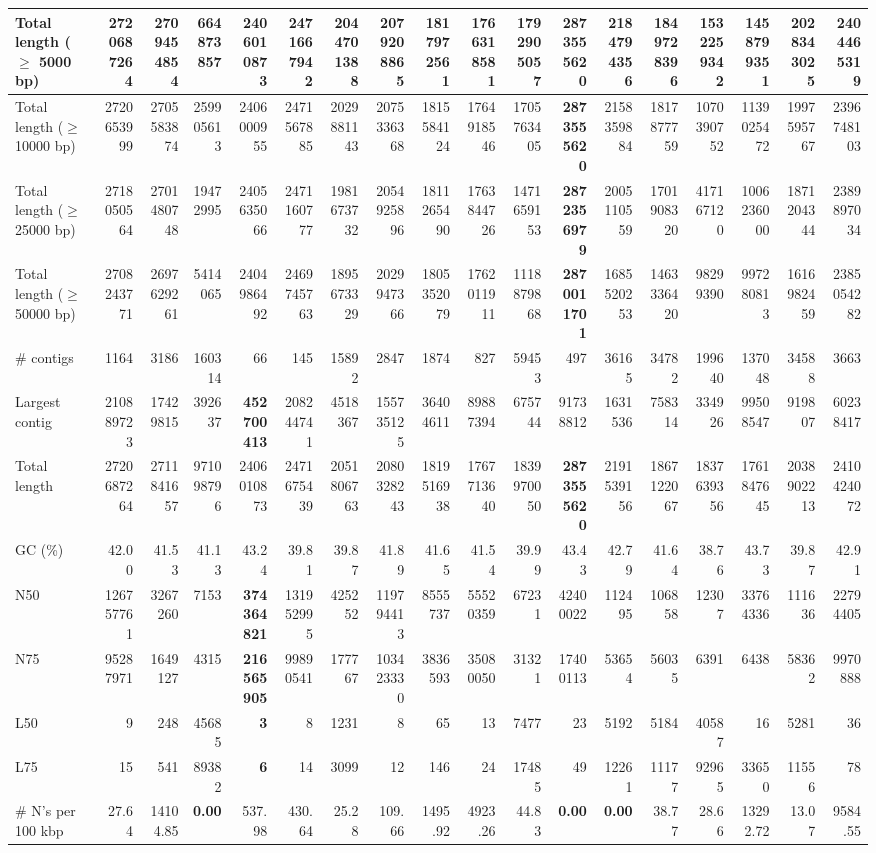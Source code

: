 \documentclass[12pt,a4paper]{article}
\begin{document}
\begin{table}[ht]
\begin{center}
\begin{tabular}{|l*{17}{|r}|}
Total length ($\geq$ 5000 bp) & 2720687264 & 2709454854 & 664873857 & 2406010873 & 2471667942 & 2044701388 & 2079208865 & 1817972561 & 1766318581 & 1792905057 & {\bf 2873555620} & 2184794356 & 1849728396 & 1532259342 & 1458799351 & 2028343025 & 2404465319 \\ \hline
Total length ($\geq$ 10000 bp) & 2720653999 & 2705583874 & 259905613 & 2406000955 & 2471567885 & 2029881143 & 2075336368 & 1815584124 & 1764918546 & 1705763405 & {\bf 2873555620} & 2158359884 & 1817877759 & 1070390752 & 1139025472 & 1997595767 & 2396748103 \\ \hline
Total length ($\geq$ 25000 bp) & 2718050564 & 2701480748 & 19472995 & 2405635066 & 2471160777 & 1981673732 & 2054925896 & 1811265490 & 1763844726 & 1471659153 & {\bf 2872356979} & 2005110559 & 1701908320 & 417167120 & 1006236000 & 1871204344 & 2389897034 \\ \hline
Total length ($\geq$ 50000 bp) & 2708243771 & 2697629261 & 5414065 & 2404986492 & 2469745763 & 1895673329 & 2029947366 & 1805352079 & 1762011911 & 1118879868 & {\bf 2870011701} & 1685520253 & 1463336420 & 98299390 & 997280813 & 1616982459 & 2385054282 \\ \hline
\# contigs & 1164 & 3186 & 160314 & 66 & 145 & 15892 & 2847 & 1874 & 827 & 59453 & 497 & 36165 & 34782 & 199640 & 137048 & 34588 & 3663 \\ \hline
Largest contig & 210889723 & 17429815 & 392637 & {\bf 452700413} & 208244741 & 4518367 & 155735125 & 36404611 & 89887394 & 675744 & 91738812 & 1631536 & 758314 & 334926 & 99508547 & 919807 & 60238417 \\ \hline
Total length & 2720687264 & 2711841657 & 971098796 & 2406010873 & 2471675439 & 2051806763 & 2080328243 & 1819516938 & 1767713640 & 1839970050 & {\bf 2873555620} & 2191539156 & 1867122067 & 1837639356 & 1761847645 & 2038902213 & 2410424072 \\ \hline
GC (\%) & 42.00 & 41.53 & 41.13 & 43.24 & 39.81 & 39.87 & 41.89 & 41.65 & 41.54 & 39.99 & 43.43 & 42.79 & 41.64 & 38.76 & 43.73 & 39.87 & 42.91 \\ \hline
N50 & 126757761 & 3267260 & 7153 & {\bf 374364821} & 131952995 & 425252 & 119794413 & 8555737 & 55520359 & 67231 & 42400022 & 112495 & 106858 & 12307 & 33764336 & 111636 & 22794405 \\ \hline
N75 & 95287971 & 1649127 & 4315 & {\bf 216565905} & 99890541 & 177767 & 103423330 & 3836593 & 35080050 & 31321 & 17400113 & 53654 & 56035 & 6391 & 6438 & 58362 & 9970888 \\ \hline
L50 & 9 & 248 & 45685 & {\bf 3} & 8 & 1231 & 8 & 65 & 13 & 7477 & 23 & 5192 & 5184 & 40587 & 16 & 5281 & 36 \\ \hline
L75 & 15 & 541 & 89382 & {\bf 6} & 14 & 3099 & 12 & 146 & 24 & 17485 & 49 & 12261 & 11177 & 92965 & 33650 & 11556 & 78 \\ \hline
\# N's per 100 kbp & 27.64 & 14104.85 & {\bf 0.00} & 537.98 & 430.64 & 25.28 & 109.66 & 1495.92 & 4923.26 & 44.83 & {\bf 0.00} & {\bf 0.00} & 38.77 & 28.66 & 13292.72 & 13.07 & 9584.55 \\ \hline
\end{tabular}
\end{center}
\end{table}
\end{document}

